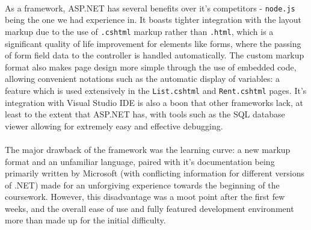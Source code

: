 \documentclass{article}
\begin{document}
    \paragraph{}
        As a framework, ASP.NET has several benefits over it's competitors - \texttt{node.js} being the one we had experience in.
        It boasts tighter integration with the layout markup due to the use of \texttt{.cshtml} markup rather than \texttt{.html}, which is a significant quality of life improvement for elements like forms, where the passing of form field data to the controller is handled automatically.
        The custom markup format also makes page design more simple through the use of embedded code, allowing convenient notations such as the automatic display of variables: a feature which is used extensively in the \texttt{List.cshtml} and \texttt{Rent.cshtml} pages.
        It's integration with Visual Studio IDE is also a boon that other frameworks lack, at least to the extent that ASP.NET has, with tools such as the SQL database viewer allowing for extremely easy and effective debugging.

    \paragraph{}
        The major drawback of the framework was the learning curve: a new markup format and an unfamiliar language, paired with it's documentation being primarily written by Microsoft (with conflicting information for different versions of .NET) made for an unforgiving experience towards the beginning of the coursework.
        However, this disadvantage was a moot point after the first few weeks, and the overall ease of use and fully featured development environment more than made up for the initial difficulty.
\end{document}
